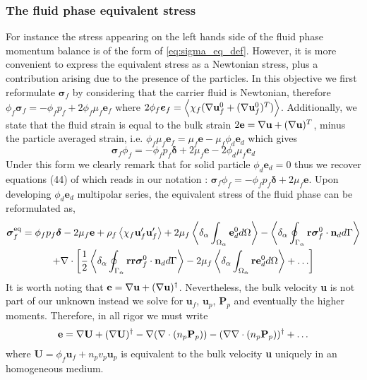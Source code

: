 \subsubsection{The fluid phase equivalent stress}
For instance the stress appearing on the left hands side of the fluid phase momentum balance is of the form of \ref{eq:sigma_eq_def}. 
However, it is more convenient to express the equivalent stress as a Newtonian stress, plus a contribution arising due to the presence of the particles. 
In this objective we first reformulate $\bm{\sigma}_f$ by considering that the carrier fluid is Newtonian, therefore $\phi_f \bm{\sigma}_f = - \phi_f p_f + 2 \phi_f \mu_f \textbf{e}_f$ where $2 \phi_f \bm{e}_f = \left<\chi_f  (\mathbf{\nabla} \textbf{u}_f^0 + (\mathbf{\nabla} \textbf{u}_f^0)^T)\right>$. 
Additionally, we state that the fluid strain is equal to the bulk strain $2\textbf{e} = \mathbf{\nabla} \textbf{u}+ (\mathbf{\nabla} \textbf{u})^T$, minus the particle averaged strain, i.e. $\phi_f \mu_f \textbf{e}_f = \mu_f\textbf{e} - \mu_f \phi_d \textbf{e}_d$ which gives
\begin{equation*}
    \bm\sigma_f\phi_f =-\phi_f p_f \bm\delta + 2 \mu_f \textbf{e} -2\phi_d \mu_f \textbf{e}_d
    \label{eq:def_sigma_f}
\end{equation*}
Under this form we clearly remark that for solid particle $\phi_d \textbf{e}_d = 0$ thus we recover equations (44) of \citet{jackson1997locally} which reads in our notation : $\bm\sigma_f\phi_f =-\phi_f p_f \bm\delta + 2 \mu_f \textbf{e}$. 
Upon developing $\phi_d \textbf{e}_d$ multipolar series, the equivalent stress of the fluid phase can be reformulated as, 
\begin{multline}
    \bm{\sigma}^\text{eq}_f = 
    \phi_f p_f \bm\delta 
    - 2\mu_f \textbf{e} 
    + \rho_f\left<\chi_f\textbf{u}_f'\textbf{u}_f'\right> 
    + 2 \mu_f \left<\delta_\alpha \int_{\Omega_\alpha} \textbf{e}_d^0 d\Omega\right>
    - \left<\delta_\alpha \oint_{\Gamma_\alpha} \textbf{r}\bm{\sigma}_f^0\cdot \textbf{n}_d d\Gamma\right>
    \\
    + \mathbf{\nabla}\cdot \left[
        \frac{1}{2} \left<\delta_\alpha \oint_{\Gamma_\alpha} \textbf{rr}\bm{\sigma}_f^0\cdot \textbf{n}_d d\Gamma\right>
        - 2 \mu_f\left<\delta_\alpha \int_{\Omega_\alpha}  \textbf{re}_d^0  d\Omega\right>
        + \ldots
    \right]
    \label{eq:sigma_eq_0}
\end{multline} 
It is worth noting that $\textbf{e} = \mathbf{\nabla} \textbf{u} + (\mathbf{\nabla} \textbf{u})^\dagger$. 
Nevertheless, the bulk velocity \textbf{u} is not part of our unknown instead we solve for $\textbf{u}_f$, $\textbf{u}_p$, $\textbf{P}_p$ and eventually the higher moments. 
Therefore, in all rigor we must write 
\begin{equation}
    \textbf{e}
    = 
    \mathbf{\nabla} \textbf{U} + (\mathbf{\nabla} \textbf{U})^\dagger
    - \mathbf{\nabla} (\mathbf{\nabla}\cdot (n_p \textbf{P}_p))
    - (\mathbf{\nabla} \mathbf{\nabla}\cdot (n_p \textbf{P}_p))^\dagger
    + \ldots
    \label{eq:rate_of_strain}
\end{equation}
where $\textbf{U} = \phi_f \textbf{u}_f + n_p v_p \textbf{u}_p$ is equivalent to the bulk velocity \textbf{u} uniquely in an homogeneous medium. 

